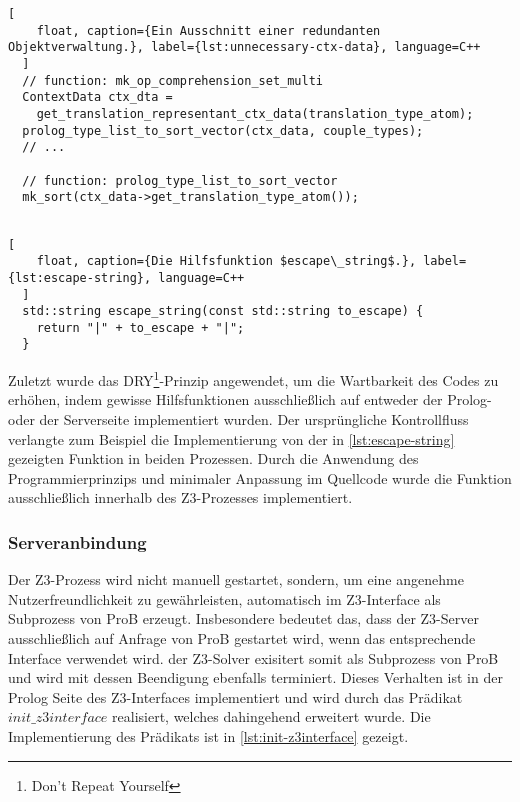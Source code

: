 \begin{lstlisting}[
    float, caption={Ein Ausschnitt einer redundanten Objektverwaltung.}, label={lst:unnecessary-ctx-data}, language=C++
  ]
  // function: mk_op_comprehension_set_multi
  ContextData ctx_dta =
    get_translation_representant_ctx_data(translation_type_atom);
  prolog_type_list_to_sort_vector(ctx_data, couple_types);
  // ...
  
  // function: prolog_type_list_to_sort_vector
  mk_sort(ctx_data->get_translation_type_atom());
  
\end{lstlisting}

\begin{lstlisting}[
    float, caption={Die Hilfsfunktion $escape\_string$.}, label={lst:escape-string}, language=C++
  ]
  std::string escape_string(const std::string to_escape) {
    return "|" + to_escape + "|";
  }
\end{lstlisting}

Zuletzt wurde das DRY\footnote{Don't Repeat Yourself}-Prinzip angewendet, um die Wartbarkeit des Codes zu erhöhen,
indem gewisse Hilfsfunktionen ausschließlich auf entweder der Prolog- oder der Serverseite implementiert wurden.
Der ursprüngliche Kontrollfluss verlangte zum Beispiel die Implementierung von der in \cref{lst:escape-string} gezeigten Funktion
in beiden Prozessen. Durch die Anwendung des Programmierprinzips und minimaler Anpassung im Quellcode wurde die Funktion ausschließlich innerhalb des Z3-Prozesses implementiert.

\subsubsection{Serveranbindung}
\label{subsec:server-connection}

Der Z3-Prozess wird nicht manuell gestartet, sondern,
um eine angenehme Nutzerfreundlichkeit zu gewährleisten, automatisch im Z3-Interface als Subprozess von ProB erzeugt.
Insbesondere bedeutet das, dass der Z3-Server ausschließlich auf Anfrage von ProB gestartet wird, wenn das entsprechende Interface verwendet wird.
der Z3-Solver exisitert somit als Subprozess von ProB und wird mit dessen Beendigung ebenfalls terminiert.
Dieses Verhalten ist in der Prolog Seite des Z3-Interfaces implementiert und wird durch das Prädikat $init\_z3interface$ realisiert, welches dahingehend erweitert wurde.
Die Implementierung des Prädikats ist in \cref{lst:init-z3interface} gezeigt.

